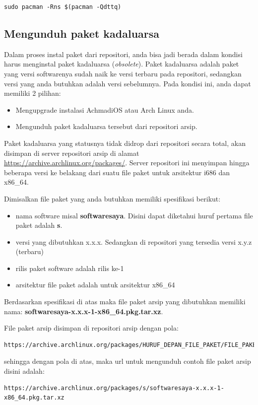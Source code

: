 \documentclass[12pt,]{article}
\begin{document}
	\begin{verbatim}
sudo pacman -Rns $(pacman -Qdttq)
	\end{verbatim}
	
	\subsection{Mengunduh paket kadaluarsa}
	Dalam proses instal paket dari repositori, anda bisa jadi berada dalam kondisi harus menginstal paket kadaluarsa (\textit{obsolete}).
	Paket kadaluarsa adalah paket yang versi softwarenya sudah naik ke versi terbaru pada repositori,
	sedangkan versi yang anda butuhkan adalah versi sebelumnya.
	Pada kondisi ini, anda dapat memiliki 2 pilihan:
	\begin{itemize}
		\item Mengupgrade instalasi AchmadiOS atau Arch Linux anda.
		\item Mengunduh paket kadaluarsa tersebut dari repositori arsip.
	\end{itemize}

	Paket kadaluarsa yang statusnya tidak didrop dari repositori secara total,
	akan disimpan di server repositori arsip di alamat \url{https://archive.archlinux.org/packages/}.
	Server repositori ini menyimpan hingga beberapa versi ke belakang dari suatu file paket untuk arsitektur i686 dan x86\_64.
	
	Dimisalkan file paket yang anda butuhkan memiliki spesifikasi berikut:
	\begin{itemize}
		\item nama software misal \textbf{softwaresaya}. Disini dapat diketahui huruf pertama file paket adalah \textbf{s}.
		\item versi yang dibutuhkan x.x.x. Sedangkan di repositori yang tersedia versi x.y.z (terbaru)
		\item rilis paket software adalah rilis ke-1
		\item arsitektur file paket adalah untuk arsitektur x86\_64
	\end{itemize}
	Berdasarkan spesifikasi di atas maka file paket arsip yang dibutuhkan memiliki nama:
	\textbf{softwaresaya-x.x.x-1-x86\_64.pkg.tar.xz}.
	
	File paket arsip disimpan di repositori arsip dengan pola:
	\begin{verbatim}
https://archive.archlinux.org/packages/HURUF_DEPAN_FILE_PAKET/FILE_PAKET_ARSIP
	\end{verbatim}
	sehingga dengan pola di atas, maka url untuk mengunduh contoh file paket arsip disini adalah:
	\begin{verbatim}
https://archive.archlinux.org/packages/s/softwaresaya-x.x.x-1-x86_64.pkg.tar.xz
	\end{verbatim}
	
\end{document}
